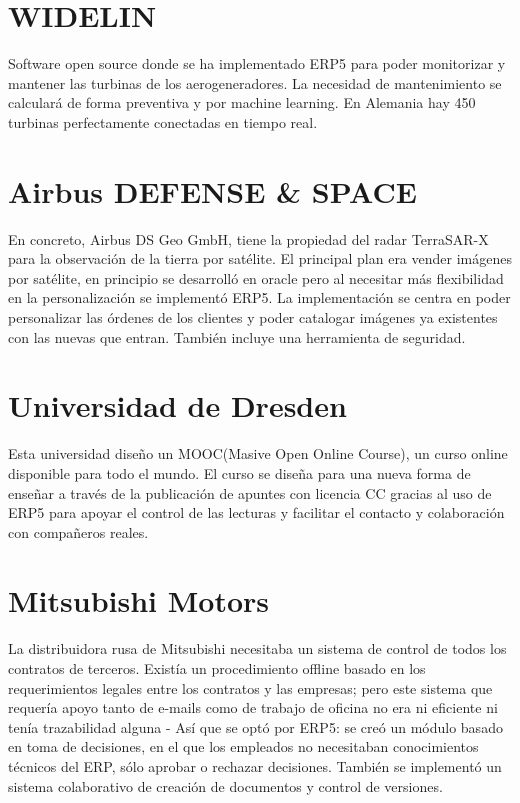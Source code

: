 \section{WIDELIN}
Software open source donde se ha implementado ERP5 para poder monitorizar y mantener las turbinas de los aerogeneradores. La necesidad de mantenimiento se calculará de forma preventiva y por machine learning. En Alemania hay 450 turbinas perfectamente conectadas en tiempo real.

\section{Airbus DEFENSE \& SPACE}
En concreto, Airbus DS Geo GmbH, tiene la propiedad del radar TerraSAR-X para la observación de la tierra por satélite. El principal plan era vender imágenes por satélite, en principio se desarrolló en oracle pero al necesitar más flexibilidad en la personalización se implementó ERP5. La implementación se centra en poder personalizar las órdenes de los clientes y poder catalogar imágenes ya existentes con las nuevas que entran. También incluye una herramienta de seguridad.

\section{Universidad de Dresden}
Esta universidad diseño un MOOC(Masive Open Online Course), un curso online disponible para todo el mundo. El curso se diseña para una nueva forma de enseñar a través de la publicación de apuntes con licencia CC gracias al uso de ERP5 para apoyar el control de las lecturas y facilitar el contacto y colaboración con compañeros reales.

\section{Mitsubishi Motors}
La distribuidora rusa de Mitsubishi necesitaba un sistema de control de todos los contratos de terceros. Existía un procedimiento offline basado en los requerimientos legales entre los contratos y las empresas; pero este sistema que requería apoyo tanto de e-mails como de trabajo de oficina no era ni eficiente ni tenía trazabilidad alguna - Así que se optó por ERP5: se creó un módulo basado en toma de decisiones, en el que los empleados no necesitaban conocimientos técnicos del ERP, sólo aprobar o rechazar decisiones. También se implementó un sistema colaborativo de creación de documentos y control de versiones.